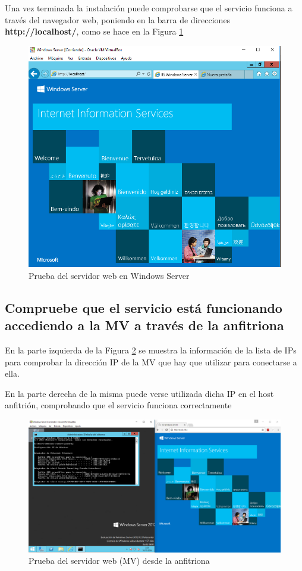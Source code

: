 	Una vez terminada la instalación puede comprobarse que el servicio funciona a través del navegador web, poniendo en la barra de direcciones \textbf{http://localhost/}, como se hace en la Figura \ref{fig:figura37}
	\begin{figure}[H]
		\centering
		\includegraphics[scale=0.4]{figuras/figura37.png} 
		\caption{Prueba del servidor web en Windows Server} 
		\label{fig:figura37}
	\end{figure}

\subsection{Compruebe
	que el servicio está funcionando accediendo a la MV a través de la
	anfitriona}		
		
		En la parte izquierda de la Figura \ref{fig:figura38} se muestra la información de la lista de IPs para comprobar la dirección IP de la MV que hay que utilizar para conectarse a ella.
		
		En la parte derecha de la misma puede verse utilizada dicha IP en el host anfitrión, comprobando que el servicio funciona correctamente 
		
		\begin{figure}[H] %
			\centering
			\includegraphics[scale=0.4]{figuras/figura38.png} 
			\caption{Prueba del servidor web (MV) desde la anfitriona} 
			\label{fig:figura38}
		\end{figure}

